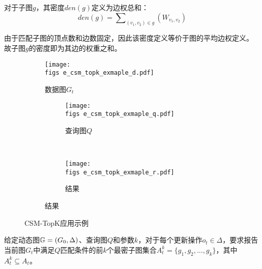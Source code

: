     \begin{definition}[子图密度]\label{def:subgraph-density}

    对于子图$g$，其密度$den(g)$定义为边权总和：
    \begin{equation}\label{euq:dense_g}
        den(g) = \sum\nolimits_{(v_1,v_2)\in g}\left(W_{v_1,v_2}\right)
    \end{equation}
    
    由于匹配子图的顶点数和边数固定，因此该密度定义等价于图的平均边权定义。
    故子图$g$的密度即为其边的权重之和。
    \end{definition}
    
    \begin{figure}
        \def\wscorevone{0.49\linewidth}
        \centering
        \begin{subfigure}[h!]{0.59\linewidth}
            \centering
            \texttt{[image: \\figs e\_csm\_topk\_exmaple\_d.pdf]} %
            \caption{数据图$G_t$}
            \label{fig:example_data_graph}
        \end{subfigure}
        \hspace{-0.1cm} %
      \begin{subfigure}[t]{0.39\linewidth}
        \centering
        \begin{subfigure}[t]{\linewidth} %
          \centering
          \texttt{[image: \\figs e\_csm\_topk\_exmaple\_q.pdf]} %
          \caption{查询图$Q$}
          \label{fig:example_query_graph}
        \end{subfigure}
        \\[2.5em] %
        \begin{subfigure}[t]{\linewidth} %
            \centering
            \texttt{[image: \\figs e\_csm\_topk\_exmaple\_r.pdf]} %
            \caption{结果}
            \label{fig:example_result}
          \end{subfigure}
      \end{subfigure}
      \caption{CSM-TopK应用示例}
      \label{fig:csm-topk}
    \end{figure}
    \begin{definition}\label{def:problem-definition}
    给定动态图$\mathbb{G}=(G_0, \Delta)$、查询图$Q$和参数$k$，对于每个更新操作$o_t\in \Delta$，要求报告当前图$G_t$中满足$Q$匹配条件的前$k$个最密子图集合$A_{t}^k= \{g_1, g_2, \ldots, g_k\}$，其中$A_t^k\subseteq A_t$。
    \end{definition}
